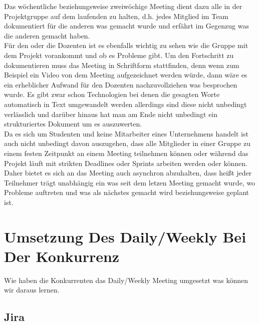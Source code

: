 Das wöchentliche beziehungsweise zweiwöchige Meeting dient dazu alle in der Projektgruppe auf dem laufenden zu halten, d.h. jedes Mitglied im Team dokumentiert für die anderen was gemacht wurde und erfährt im Gegenzug was die anderen gemacht haben.\\
Für den oder die Dozenten ist es ebenfalls wichtig zu sehen wie die Gruppe mit dem Projekt vorankommt und ob es Probleme gibt. Um den Fortschritt zu dokumentieren muss das Meeting in Schriftform stattfinden, denn wenn zum Beispiel ein Video von dem Meeting aufgezeichnet werden würde, dann wäre es ein erheblicher Aufwand für den Dozenten nachzuvollziehen was besprochen wurde. Es gibt zwar schon Technologien bei denen die gesagten Worte automatisch in Text umgewandelt werden allerdings sind diese nicht unbedingt verlässlich und darüber hinaus hat man am Ende nicht unbedingt ein strukturiertes Dokument um es auszuwerten.\\
Da es sich um Studenten und keine Mitarbeiter eines Unternehmens handelt ist auch nicht unbedingt davon auszugehen, dass alle Mitglieder in einer Gruppe zu einem festen Zeitpunkt an einem Meeting teilnehmen können oder während das Projekt läuft mit strikten Deadlines oder Sprints arbeiten werden oder können. Daher bietet es sich an das Meeting auch asynchron abzuhalten, dass heißt jeder Teilnehmer trägt unabhängig ein was seit dem letzen Meeting gemacht wurde, wo Probleme auftreten und was als nächstes gemacht wird beziehungsweise geplant ist. 

\section{Umsetzung Des Daily/Weekly Bei Der Konkurrenz}

Wie haben die Konkurrenten das Daily/Weekly Meeting umgesetzt was können wir daraus lernen.

\subsection{Jira}

